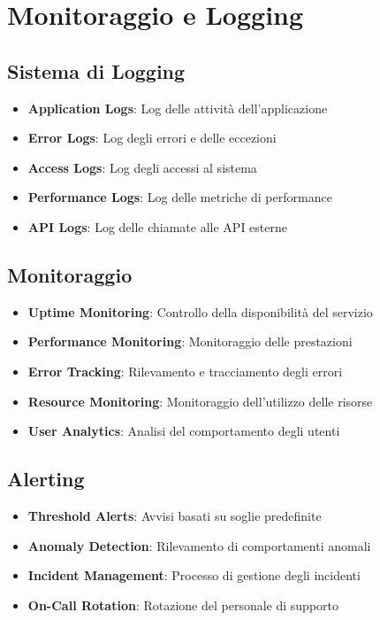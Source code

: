\section{Monitoraggio e Logging}

\subsection{Sistema di Logging}
\begin{itemize}
    \item \textbf{Application Logs}: Log delle attività dell'applicazione
    \item \textbf{Error Logs}: Log degli errori e delle eccezioni
    \item \textbf{Access Logs}: Log degli accessi al sistema
    \item \textbf{Performance Logs}: Log delle metriche di performance
    \item \textbf{API Logs}: Log delle chiamate alle API esterne
\end{itemize}

\subsection{Monitoraggio}
\begin{itemize}
    \item \textbf{Uptime Monitoring}: Controllo della disponibilità del servizio
    \item \textbf{Performance Monitoring}: Monitoraggio delle prestazioni
    \item \textbf{Error Tracking}: Rilevamento e tracciamento degli errori
    \item \textbf{Resource Monitoring}: Monitoraggio dell'utilizzo delle risorse
    \item \textbf{User Analytics}: Analisi del comportamento degli utenti
\end{itemize}

\subsection{Alerting}
\begin{itemize}
    \item \textbf{Threshold Alerts}: Avvisi basati su soglie predefinite
    \item \textbf{Anomaly Detection}: Rilevamento di comportamenti anomali
    \item \textbf{Incident Management}: Processo di gestione degli incidenti
    \item \textbf{On-Call Rotation}: Rotazione del personale di supporto
\end{itemize}

